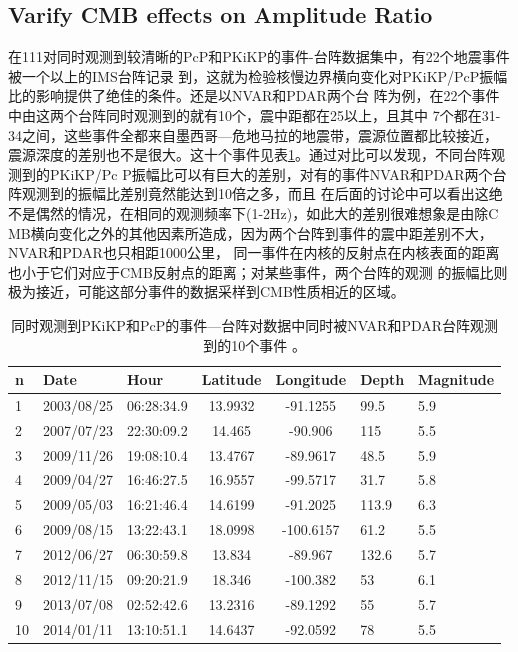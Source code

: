 \subsection{Varify CMB effects on Amplitude Ratio}

在111对同时观测到较清晰的PcP和PKiKP的事件-台阵数据集中，有22个地震事件被一个以上的IMS台阵记录
到，这就为检验核慢边界横向变化对PKiKP/PcP振幅比的影响提供了绝佳的条件。还是以NVAR和PDAR两个台
阵为例，在22个事件中由这两个台阵同时观测到的就有10个，震中距都在25{\textdegree}以上，且其中
7个都在31-34{\textdegree}之间，这些事件全都来自墨西哥—危地马拉的地震带，震源位置都比较接近，
震源深度的差别也不是很大。这十个事件见表\ref{nvpd}。通过对比可以发现，不同台阵观测到的PKiKP/Pc
P振幅比可以有巨大的差别，对有的事件NVAR和PDAR两个台阵观测到的振幅比差别竟然能达到10倍之多，而且
在后面的讨论中可以看出这绝不是偶然的情况，在相同的观测频率下(1-2Hz)，如此大的差别很难想象是由除C
MB横向变化之外的其他因素所造成，因为两个台阵到事件的震中距差别不大，NVAR和PDAR也只相距1000公里，
同一事件在内核的反射点在内核表面的距离也小于它们对应于CMB反射点的距离；对某些事件，两个台阵的观测
的振幅比则极为接近，可能这部分事件的数据采样到CMB性质相近的区域。

\begin{table}[!ht]
	\centering
	\begin{tabular}{*{3}{l}*{2}{c}*{2}{l}}
	\hline
	n & Date & Hour & Latitude & Longitude & Depth & Magnitude\\
	\hline
1 & 2003/08/25 & 06:28:34.9 &  13.9932 &  -91.1255 &  99.5 & 5.9\\
2 & 2007/07/23 & 22:30:09.2 &  14.465  &  -90.906  &  115  & 5.5\\
3 & 2009/11/26 & 19:08:10.4 &  13.4767 &  -89.9617 &  48.5 & 5.9\\
4 & 2009/04/27 & 16:46:27.5 &  16.9557 &  -99.5717 &  31.7 & 5.8\\
5 & 2009/05/03 & 16:21:46.4 &  14.6199 &  -91.2025 &  113.9 & 6.3\\
6 & 2009/08/15 & 13:22:43.1 &  18.0998 & -100.6157 &  61.2 & 5.5\\
7 & 2012/06/27 & 06:30:59.8 &  13.834  &  -89.967  &  132.6 & 5.7\\
8 & 2012/11/15 & 09:20:21.9 &  18.346  & -100.382  &  53  & 6.1\\
9 & 2013/07/08 & 02:52:42.6 &  13.2316 &  -89.1292 &  55  & 5.7\\
10 & 2014/01/11 & 13:10:51.1 &  14.6437 &  -92.0592 &  78  & 5.5\\
	\hline
\end{tabular}
	\caption{同时观测到PKiKP和PcP的事件—台阵对数据中同时被NVAR和PDAR台阵观测到的10个事件%
。}
	\label{nvpd}
\end{table}

